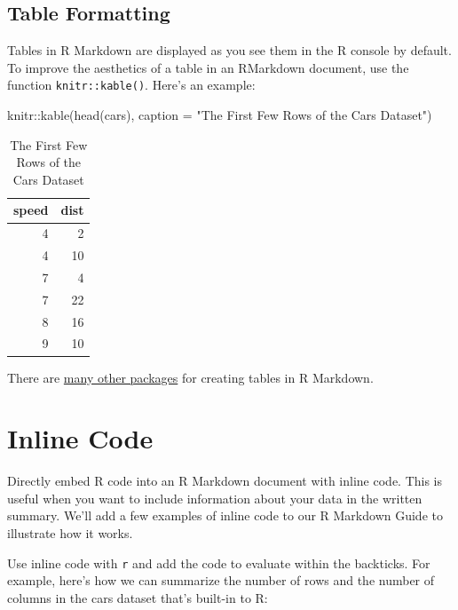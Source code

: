\documentclass[
]{book}
\newenvironment{Shaded}{\begin{snugshade}}{\end{snugshade}}
\newcommand{\AttributeTok}[1]{\textcolor[rgb]{0.77,0.63,0.00}{#1}}
\newcommand{\FunctionTok}[1]{\textcolor[rgb]{0.00,0.00,0.00}{#1}}
\newcommand{\NormalTok}[1]{#1}
\newcommand{\SpecialCharTok}[1]{\textcolor[rgb]{0.00,0.00,0.00}{#1}}
\newcommand{\StringTok}[1]{\textcolor[rgb]{0.31,0.60,0.02}{#1}}
\begin{document}
\hypertarget{table-formatting}{%
\subsection{Table Formatting}\label{table-formatting}}

Tables in R Markdown are displayed as you see them in the R console by default. To improve the aesthetics of a table in an RMarkdown document, use the function \texttt{knitr::kable()}. Here's an example:

\begin{Shaded}
\begin{Highlighting}[]
\NormalTok{knitr}\SpecialCharTok{::}\FunctionTok{kable}\NormalTok{(}\FunctionTok{head}\NormalTok{(cars), }\AttributeTok{caption =} \StringTok{"The First Few Rows of the Cars Dataset"}\NormalTok{)}
\end{Highlighting}
\end{Shaded}

\begin{table}

\caption{\label{tab:unnamed-chunk-1}The First Few Rows of the Cars Dataset}
\centering
\begin{tabular}[t]{r|r}
\hline
speed & dist\\
\hline
4 & 2\\
\hline
4 & 10\\
\hline
7 & 4\\
\hline
7 & 22\\
\hline
8 & 16\\
\hline
9 & 10\\
\hline
\end{tabular}
\end{table}

There are \href{https://bookdown.org/yihui/rmarkdown-cookbook/table-other.html}{many other packages} for creating tables in R Markdown.

\hypertarget{inline-code}{%
\section{Inline Code}\label{inline-code}}

Directly embed R code into an R Markdown document with inline code. This is useful when you want to include information about your data in the written summary. We'll add a few examples of inline code to our R Markdown Guide to illustrate how it works.

Use inline code with \texttt{r} and add the code to evaluate within the backticks. For example, here's how we can summarize the number of rows and the number of columns in the cars dataset that's built-in to R:
\end{document}

